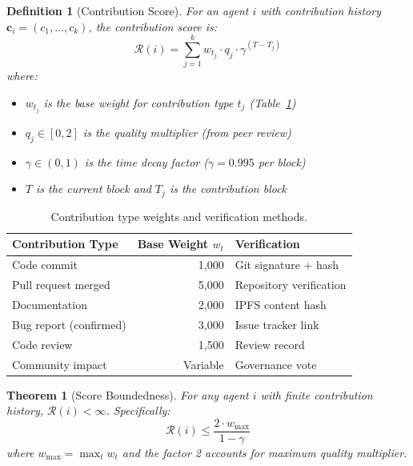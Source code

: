 \documentclass[conference]{IEEEtran}
\newtheorem{theorem}{Theorem}
\newtheorem{definition}{Definition}
\begin{document}
\begin{definition}[Contribution Score]
For an agent $i$ with contribution history $\mathbf{c}_i = (c_1, \ldots, c_k)$, the contribution score is:
\begin{equation}\label{eq:score}
    \mathcal{R}(i) = \sum_{j=1}^{k} w_{t_j} \cdot q_j \cdot \gamma^{(T - T_j)}
\end{equation}
where:
\begin{itemize}
    \item $w_{t_j}$ is the base weight for contribution type $t_j$ (Table~\ref{tab:weights})
    \item $q_j \in [0, 2]$ is the quality multiplier (from peer review)
    \item $\gamma \in (0, 1)$ is the time decay factor ($\gamma = 0.995$ per block)
    \item $T$ is the current block and $T_j$ is the contribution block
\end{itemize}
\end{definition}

\begin{table}[t]
\centering
\begin{tabular}{lrl}
\toprule
\textbf{Contribution Type} & \textbf{Base Weight} $w_t$ & \textbf{Verification} \\
\midrule
Code commit & 1,000 & Git signature + hash \\
Pull request merged & 5,000 & Repository verification \\
Documentation & 2,000 & IPFS content hash \\
Bug report (confirmed) & 3,000 & Issue tracker link \\
Code review & 1,500 & Review record \\
Community impact & Variable & Governance vote \\
\bottomrule
\end{tabular}
\caption{Contribution type weights and verification methods.}
\label{tab:weights}
\end{table}

\begin{theorem}[Score Boundedness]\label{thm:bounded}
For any agent $i$ with finite contribution history, $\mathcal{R}(i) < \infty$. Specifically:
\begin{equation}
    \mathcal{R}(i) \leq \frac{2 \cdot w_{\max}}{1 - \gamma}
\end{equation}
where $w_{\max} = \max_t w_t$ and the factor 2 accounts for maximum quality multiplier.
\end{theorem}
\end{document}
